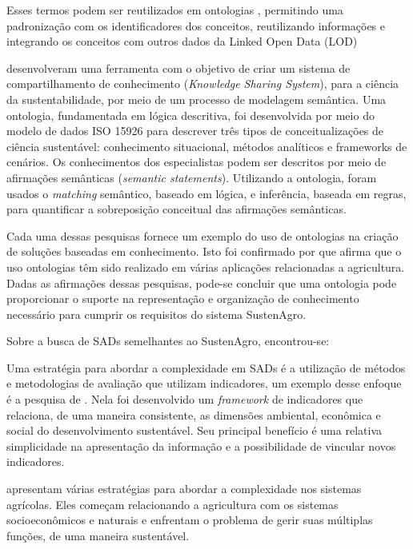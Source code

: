 Esses termos podem ser reutilizados em ontologias \citep{DCMIPro841},
permitindo uma padronização com os identificadores dos conceitos,
reutilizando informações e integrando os conceitos com outros dados
da \foreignlanguage{english}{Linked Open Data} (\foreignlanguage{english}{LOD})

\citet{kraines2011system} desenvolveram uma ferramenta com o objetivo
de criar um sistema de compartilhamento de conhecimento (\foreignlanguage{english}{\emph{Knowledge
Sharing System}}), para a ciência da sustentabilidade, por meio de
um processo de modelagem semântica. Uma ontologia, fundamentada em
lógica descritiva, foi desenvolvida por meio do modelo de dados ISO
15926 para descrever três tipos de conceitualizações de ciência sustentável:
conhecimento situacional, métodos analíticos e \foreignlanguage{english}{frameworks}
de cenários. Os conhecimentos dos especialistas podem ser descritos
por meio de afirmações semânticas (\foreignlanguage{english}{\emph{semantic
statements}}). Utilizando a ontologia, foram usados o \foreignlanguage{english}{\emph{matching}}
semântico, baseado em lógica, e inferência, baseada em regras, para
quantificar a sobreposição conceitual das afirmações semânticas.

Cada uma dessas pesquisas fornece um exemplo do uso de ontologias
na criação de soluções baseadas em conhecimento. Isto foi confirmado
por \citep{roussey2010ontologies} que afirma que o uso ontologias
têm sido realizado em várias aplicações relacionadas a agricultura.
Dadas as afirmações dessas pesquisas, pode-se concluir que uma ontologia
pode proporcionar o suporte na representação e organização de conhecimento
necessário para cumprir os requisitos do sistema SustenAgro.

Sobre a busca de SADs semelhantes ao SustenAgro, encontrou-se: 

Uma estratégia para abordar a complexidade em SADs é a utilização
de métodos e metodologias de avaliação que utilizam indicadores, um
exemplo desse enfoque é a pesquisa de \citet{AlkanOlsson:2009}. Nela
foi desenvolvido um \foreignlanguage{english}{\emph{framework}} de
indicadores que relaciona, de uma maneira consistente, as dimensões
ambiental, econômica e social do desenvolvimento sustentável. Seu
principal benefício é uma relativa simplicidade na apresentação da
informação e a possibilidade de vincular novos indicadores.

\citet{Ewert2009546} apresentam várias estratégias para abordar a
complexidade nos sistemas agrícolas. Eles começam relacionando a agricultura
com os sistemas socioeconômicos e naturais e enfrentam o problema
de gerir suas múltiplas funções, de uma maneira sustentável.

